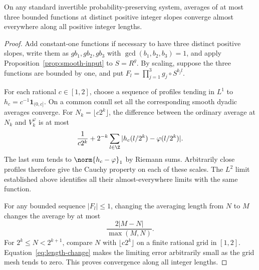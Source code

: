 \begin{lemma}\label{lem:triple-convergence}
On any standard invertible probability-preserving system, averages
of at most three bounded functions at distinct positive integer
slopes converge almost everywhere along all positive integer lengths.
\end{lemma}
\begin{proof}
Add constant-one functions if necessary to have three distinct
positive slopes, write them as $gb_1,gb_2,gb_3$ with
$\gcd(b_1,b_2,b_3)=1$, and apply
Proposition~\ref{prop:smooth-input} to $S=R^g$. By scaling, suppose
the three functions are bounded by one, and put
$F_l=\prod_{j=1}^3g_j\circ S^{b_jl}$.

For each rational $c\in[1,2]$, choose a sequence of profiles tending
in $L^1$ to $h_c=c^{-1}\mathbf1_{(0,c]}$. On a common conull set
all the corresponding smooth dyadic averages converge. For
$N_k=\lfloor c2^k\rfloor$, the difference between the ordinary
average at $N_k$ and $V_k^\varphi$ is at most
\[
 \frac1{c2^k}
 +2^{-k}\sum_{l\in\Z}|h_c(l/2^k)-\varphi(l/2^k)|.
\]
The last sum tends to $\norm{h_c-\varphi}_1$ by Riemann sums.
Arbitrarily close profiles therefore give the Cauchy property on
each of these scales. The $L^2$ limit established above identifies
all their almost-everywhere limits with the same function.

For any bounded sequence $|F_l|\le1$, changing the averaging length
from $N$ to $M$ changes the average by at most
\begin{equation}\label{eq:length-change}
                 \frac{2|M-N|}{\max(M,N)}.
\end{equation}
For $2^k\le N<2^{k+1}$, compare $N$ with
$\lfloor c2^k\rfloor$ on a finite rational grid in $[1,2]$.
Equation~\eqref{eq:length-change} makes the limiting error
arbitrarily small as the grid mesh tends to zero. This proves
convergence along all integer lengths.
\end{proof}

